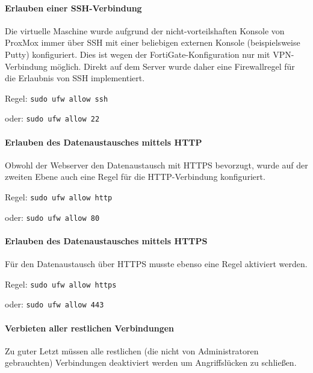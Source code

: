 \hypertarget{erlauben-einer-ssh-verbindung}{%
\paragraph{Erlauben einer
SSH-Verbindung}\label{erlauben-einer-ssh-verbindung}}

Die virtuelle Maschine wurde aufgrund der nicht-vorteilshaften Konsole
von ProxMox immer über SSH mit einer beliebigen externen Konsole
(beispielsweise Putty) konfiguriert. Dies ist wegen der
FortiGate-Konfiguration nur mit VPN-Verbindung möglich. Direkt auf dem
Server wurde daher eine Firewallregel für die Erlaubnis von SSH
implementiert.

Regel: \texttt{sudo\ ufw\ allow\ ssh}

oder: \texttt{sudo\ ufw\ allow\ 22}

\hypertarget{erlauben-des-datenaustausches-mittels-http}{%
\paragraph{Erlauben des Datenaustausches mittels
HTTP}\label{erlauben-des-datenaustausches-mittels-http}}

Obwohl der Webserver den Datenaustausch mit HTTPS bevorzugt, wurde auf
der zweiten Ebene auch eine Regel für die HTTP-Verbindung konfiguriert.

Regel: \texttt{sudo\ ufw\ allow\ http}

oder: \texttt{sudo\ ufw\ allow\ 80}

\hypertarget{erlauben-des-datenaustausches-mittels-https}{%
\paragraph{Erlauben des Datenaustausches mittels
HTTPS}\label{erlauben-des-datenaustausches-mittels-https}}

Für den Datenaustausch über HTTPS musste ebenso eine Regel aktiviert
werden.

Regel: \texttt{sudo\ ufw\ allow\ https}

oder: \texttt{sudo\ ufw\ allow\ 443}

\hypertarget{verbieten-aller-restlichen-verbindungen}{%
\paragraph{Verbieten aller restlichen
Verbindungen}\label{verbieten-aller-restlichen-verbindungen}}

Zu guter Letzt müssen alle restlichen (die nicht von Administratoren
gebrauchten) Verbindungen deaktiviert werden um Angriffslücken zu
schließen.

